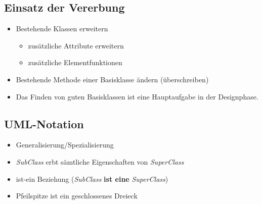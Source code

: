 \begin{multicols}{2}
\subsection{Einsatz der Vererbung}
\begin{itemize}
	\item Bestehende Klassen erweitern
	\begin{itemize}
		\item zusätzliche Attribute erweitern
		\item zusätzliche Elementfunktionen
	\end{itemize}
	\item Bestehende Methode einer Basisklasse ändern (überschreiben)
	\item Das Finden von guten Basisklassen ist eine Hauptaufgabe in der Designphase.
\end{itemize}

\subsection{UML-Notation}
\begin{itemize}
	\item Generalisierung/Spezialisierung
	\item \emph{SubClass} erbt sämtliche Eigenschaften von \emph{SuperClass}
	\item ist-ein Beziehung (\emph{SubClass} \textbf{ist eine} \emph{SuperClass})
	\item Pfeilspitze ist ein geschlossenes Dreieck
\end{itemize}
\vfill\null
\columnbreak
{}
\end{multicols}

